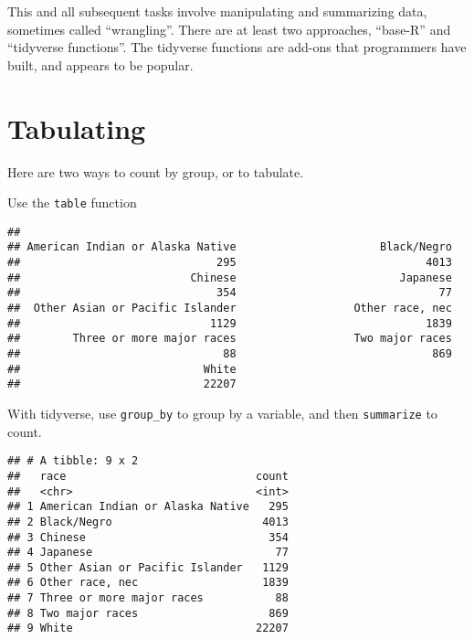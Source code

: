 \documentclass[]{book}
\newenvironment{Shaded}{\begin{snugshade}}{\end{snugshade}}
\newcommand{\KeywordTok}[1]{\textcolor[rgb]{0.13,0.29,0.53}{\textbf{#1}}}
\newcommand{\DataTypeTok}[1]{\textcolor[rgb]{0.13,0.29,0.53}{#1}}
\newcommand{\StringTok}[1]{\textcolor[rgb]{0.31,0.60,0.02}{#1}}
\newcommand{\OperatorTok}[1]{\textcolor[rgb]{0.81,0.36,0.00}{\textbf{#1}}}
\newcommand{\NormalTok}[1]{#1}
\theoremstyle{definition}
\theoremstyle{definition}
\theoremstyle{definition}
\theoremstyle{remark}
\begin{document}
This and all subsequent tasks involve manipulating and summarizing data,
sometimes called ``wrangling''. There are at least two approaches,
``base-R'' and ``tidyverse functions''. The tidyverse functions are
add-ons that programmers have built, and appears to be popular.

\section{Tabulating}\label{tabulating}

Here are two ways to count by group, or to tabulate.

Use the \texttt{table} function

\begin{Shaded}
\end{Shaded}

\begin{verbatim}
## 
## American Indian or Alaska Native                      Black/Negro 
##                              295                             4013 
##                          Chinese                         Japanese 
##                              354                               77 
##  Other Asian or Pacific Islander                  Other race, nec 
##                             1129                             1839 
##        Three or more major races                  Two major races 
##                               88                              869 
##                            White 
##                            22207
\end{verbatim}

With tidyverse, use \texttt{group\_by} to group by a variable, and then
\texttt{summarize} to count.

\begin{Shaded}
\end{Shaded}

\begin{verbatim}
## # A tibble: 9 x 2
##   race                             count
##   <chr>                            <int>
## 1 American Indian or Alaska Native   295
## 2 Black/Negro                       4013
## 3 Chinese                            354
## 4 Japanese                            77
## 5 Other Asian or Pacific Islander   1129
## 6 Other race, nec                   1839
## 7 Three or more major races           88
## 8 Two major races                    869
## 9 White                            22207
\end{verbatim}
\end{document}
